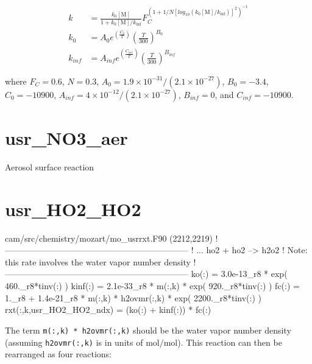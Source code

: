 \documentclass[titlepage]{article}
\begin{document}
\begin{equation}
\begin{split}
k & = \frac{k_0[\mbox{M}]}{1+k_0[\mbox{M}]/k_{\inf}}F_C^{(1+1/N[log_{10}(k_0[\mbox{M}]/k_{\inf})]^2)^{-1}} \\
k_0 & = A_0 e^{\left( \frac{C_0}{T} \right)} \left( \frac{T}{300} \right)^{B_0} \\
k_{inf} & = A_{inf} e^{\left( \frac{C_{inf}}{T} \right)} \left( \frac{T}{300} \right)^{B_{inf}}
\end{split}
\end{equation}

\noindent where $F_C = 0.6$, $N = 0.3$, $A_0 = 1.9 \times 10^{-31} / \left( 2.1 \times 10^{-27} \right)$, $B_0 = -3.4$, $C_0 = -10900$, $A_{inf} = 4 \times 10^{-12} / \left( 2.1 \times 10^{-27} \right)$, $B_{inf} = 0$, and $C_{inf} = -10900$.


\section{usr\_NO3\_aer}

Aerosol surface reaction


\section{usr\_HO2\_HO2}

\begin{blockcode}[commandchars=\\\{\}]
\color{gray}cam/src/chemistry/mozart/mo_usrrxt.F90 (2212,2219)
!-----------------------------------------------------------------
! ... ho2 + ho2 --> h2o2
! Note: this rate involves the water vapor number density
!-----------------------------------------------------------------
         ko(:)   = 3.0e-13_r8  * exp( 460._r8*tinv(:) )
         kinf(:) = 2.1e-33_r8 * m(:,k) * exp( 920._r8*tinv(:) )
         fc(:)   = 1._r8 + 1.4e-21_r8 * m(:,k) * h2ovmr(:,k) * exp( 2200._r8*tinv(:) )
         rxt(:,k,usr_HO2_HO2_ndx) = (ko(:) + kinf(:)) * fc(:)
\end{blockcode}

The term \verb>m(:,k) * h2ovmr(:,k)> should be the water vapor number density (assuming \verb>h2ovmr(:,k)> is in units of $\mbox{mol}/\mbox{mol}$). This reaction can then be rearranged as four reactions:
\vspace{20px}
\end{document}
